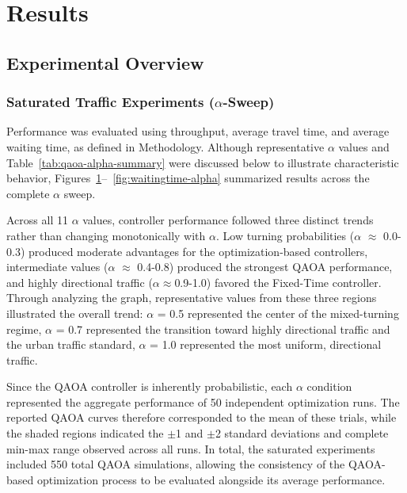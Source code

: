 \documentclass[12pt]{article}
\begin{document}
\section{Results}

\subsection{Experimental Overview}

\subsubsection{Saturated Traffic Experiments ($\alpha$-Sweep)}       
Performance was evaluated using throughput, average travel time, and average waiting time, as defined in Methodology. Although representative $\alpha$ values and Table~\ref{tab:qaoa-alpha-summary} were discussed below to illustrate characteristic behavior, Figures~\ref{fig:throughput}--~\ref{fig:waitingtime-alpha} summarized results across the complete $\alpha$ sweep.

Across all 11 $\alpha$ values, controller performance followed three distinct trends rather than changing monotonically with $\alpha$. Low turning probabilities ($\alpha$ $\approx$ 0.0-0.3) produced moderate advantages for the optimization-based controllers, intermediate values ($\alpha$ $\approx$ 0.4-0.8) produced the strongest QAOA performance, and highly directional traffic ($\alpha$$\approx$0.9-1.0) favored the Fixed-Time controller. Through analyzing the graph, representative values from these three regions illustrated the overall trend: $\alpha$ = 0.5 represented the center of the mixed-turning regime, $\alpha$ = 0.7 represented the transition toward highly directional traffic and the urban traffic standard, $\alpha$ = 1.0 represented the most uniform, directional traffic.

Since the QAOA controller is inherently probabilistic, each $\alpha$ condition represented the aggregate performance of 50 independent optimization runs. The reported QAOA curves therefore corresponded to the mean of these trials, while the shaded regions indicated the $\pm$1 and $\pm$2 standard deviations and complete min-max range observed across all runs. In total, the saturated experiments included 550 total QAOA simulations, allowing the consistency of the QAOA-based optimization process to be evaluated alongside its average performance.


\begin{figure}[htbp]
\label{fig:throughput}
\end{figure}
\end{document}
